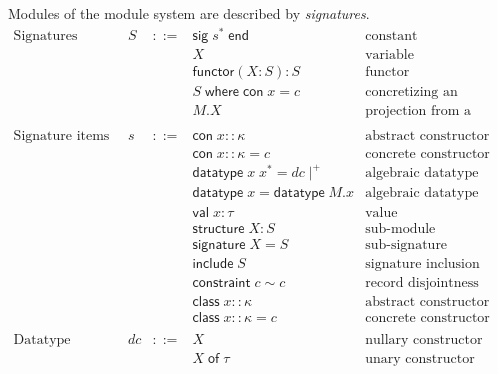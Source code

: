 \documentclass{article}
\newcommand{\mt}[1]{\mathsf{#1}}
\begin{document}
Modules of the module system are described by \emph{signatures}.
$$\begin{array}{rrcll}
  \textrm{Signatures} & S &::=& \mt{sig} \; s^* \; \mt{end} & \textrm{constant} \\
  &&& X & \textrm{variable} \\
  &&& \mt{functor}(X : S) : S & \textrm{functor} \\
  &&& S \; \mt{where} \; \mt{con} \; x = c & \textrm{concretizing an abstract constructor} \\
  &&& M.X & \textrm{projection from a module} \\
  \\
  \textrm{Signature items} & s &::=& \mt{con} \; x :: \kappa & \textrm{abstract constructor} \\
  &&& \mt{con} \; x :: \kappa = c & \textrm{concrete constructor} \\
  &&& \mt{datatype} \; x \; x^* = dc\mid^+ & \textrm{algebraic datatype definition} \\
  &&& \mt{datatype} \; x = \mt{datatype} \; M.x & \textrm{algebraic datatype import} \\
  &&& \mt{val} \; x : \tau & \textrm{value} \\
  &&& \mt{structure} \; X : S & \textrm{sub-module} \\
  &&& \mt{signature} \; X = S & \textrm{sub-signature} \\
  &&& \mt{include} \; S & \textrm{signature inclusion} \\
  &&& \mt{constraint} \; c \sim c & \textrm{record disjointness constraint} \\
  &&& \mt{class} \; x :: \kappa & \textrm{abstract constructor class} \\
  &&& \mt{class} \; x :: \kappa = c & \textrm{concrete constructor class} \\
  \\
  \textrm{Datatype constructors} & dc &::=& X & \textrm{nullary constructor} \\
  &&& X \; \mt{of} \; \tau & \textrm{unary constructor} \\
\end{array}$$
\end{document}
